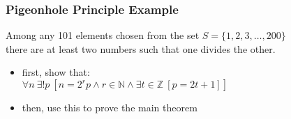 \documentclass[dvipsnames]{beamer}
\begin{document}
\begin{frame}
  \frametitle{Pigeonhole Principle Example}

  \begin{theorem}
   Among any 101 elements chosen from the set $S = \{1,2,3,\dots,200\}$\\
   there are at least two numbers such that one divides the other.
  \end{theorem}

  \pause
  \begin{itemize}
    \item first, show that:\\
      $\forall n~\exists ! p~
        [n = 2^r p \wedge r \in \mathbb{N}
          \wedge \exists t \in \mathbb Z~[p = 2t + 1]]$\\

    \item then, use this to prove the main theorem
  \end{itemize}
\end{frame}
\end{document}
